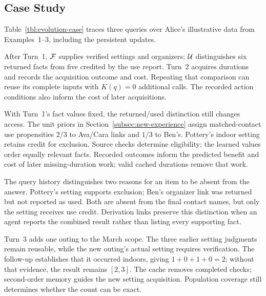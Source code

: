 \subsection{Case Study}
\label{subsec:exp9}

Table~\ref{tbl:evolution-case} traces three queries over Alice's
illustrative data from Examples~1--3, including the persistent updates.

After Turn~1, $\mathcal{F}$ supplies verified settings and organizers; $\mathcal{U}$
distinguishes six returned facts from five credited by the use report. Turn~2 acquires
durations and records the acquisition outcome and cost. Repeating that
comparison can reuse its complete inputs with $K(q)=0$ additional calls.
The recorded action conditions also inform the cost of later acquisitions.

With Turn~1's fact values fixed, the returned/used distinction still
changes access. The unit priors in Section~\ref{subsec:new-experience} assign
matched-contact use propensities $2/3$ to Ava/Cara links and $1/3$ to Ben's.
Pottery's indoor setting retains credit for exclusion. Source checks
determine eligibility; the learned values order equally relevant facts.
Recorded outcomes inform the predicted benefit and cost of later
missing-duration work; valid cached durations remove that work.

The query history distinguishes two reasons for an item to be absent
from the answer. Pottery's setting supports exclusion; Ben's organizer
link was returned but not reported as used. Both are absent from the
final contact names, but only the setting receives use credit.
Derivation links preserve this distinction when an agent reports the
combined result rather than listing every supporting fact.

Turn~3 adds one outing to the March scope. The three earlier setting
judgments remain reusable, while the new outing's actual setting requires
verification. The follow-up establishes that it occurred indoors, giving
$1+0+1+0=2$; without that evidence, the result remains $[2,3]$.
The cache removes completed checks; second-order memory guides the
new setting acquisition. Population coverage still determines whether
the count can be exact.
